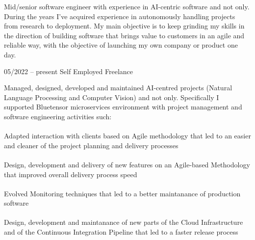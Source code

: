 \documentclass[9pt, green]{template/developercv} %
\begin{document}
\vspace{2.1mm}
{\small 
\hspace{10pt} 

	Mid/senior software engineer with experience in AI-centric software and not only. During the years I've acquired experience in autonomously handling projects from research to deployment. My main objective is to keep grinding my skills in the direction of building software that brings value to customers in an agile and reliable way, with the objective of launching my own company or product one day.

\vspace{2pt}
\vspace{2.1mm}
\begin{entrylist}

	\entry
	{05/2022 -- present }
	{}
	{Self Employed \space\cpipe\space Freelance}
	{
		\vspace{0.3mm}
		\begin{minipage}[t]{0.75\textwidth}				
			\vspace{-\baselineskip}
            Managed, designed, developed and maintained AI-centred projects (Natural Language Processing and Computer Vision) and not only. Specifically I supported Bluetensor microservices environment with project management and software engineering activities such:\\
            \vspace{-3mm}\\
            \itemmarker Adapted interaction with clients based on Agile methodology  that led to an easier and cleaner of the project planning and delivery processes\\
            \vspace{-3mm}\\
            \itemmarker Design, development and delivery of new features on an Agile-based Methodology that improved overall delivery process speed\\
            \vspace{-3mm}\\
            \itemmarker Evolved Monitoring techniques that led to a better maintanance of production software\\
            \vspace{-3mm}\\
            \itemmarker Design, development and maintanance of new parts of the Cloud Infrastructure and of the Continuous Integration Pipeline that led to a faster release process\\

\end{minipage}}
\end{entrylist}}
\end{document}
